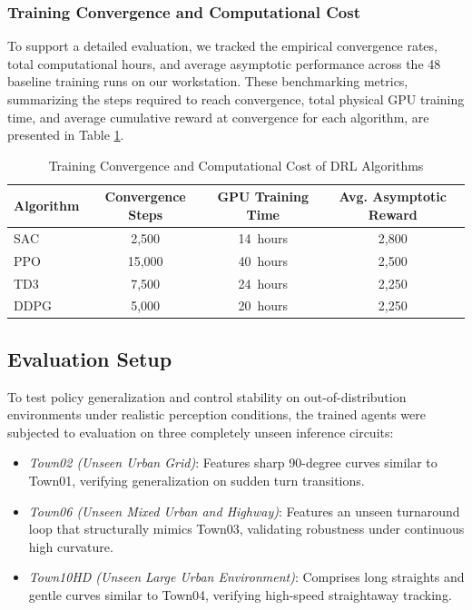 \documentclass[sn-mathphys,Numbered]{sn-jnl}
\begin{document}
\subsubsection{Training Convergence and Computational Cost}
To support a detailed evaluation, we tracked the empirical convergence rates, total computational hours, and average asymptotic performance across the 48 baseline training runs on our workstation. These benchmarking metrics, summarizing the steps required to reach convergence, total physical GPU training time, and average cumulative reward at convergence for each algorithm, are presented in Table \ref{tab:training_convergence_cost}.

\begin{table}[htbp]
\centering
\caption{Training Convergence and Computational Cost of DRL Algorithms}
\label{tab:training_convergence_cost}
\begin{tabular}{lccc}
\hline
\textbf{Algorithm} & \textbf{Convergence Steps} & \textbf{GPU Training Time} & \textbf{Avg. Asymptotic Reward} \\
\hline
SAC  & 2,500 & \SI{14}{hours} & 2,800 \\
PPO  & 15,000 & \SI{40}{hours} & 2,500 \\
TD3  & 7,500 & \SI{24}{hours} & 2,250 \\
DDPG & 5,000 & \SI{20}{hours} & 2,250 \\
\hline
\end{tabular}
\end{table}

\subsection{Evaluation Setup}
\label{sec:evaluation_setup}

To test policy generalization and control stability on out-of-distribution environments under realistic perception conditions, the trained agents were subjected to evaluation on three completely unseen inference circuits:
\begin{itemize}
    \item \textit{Town02 (Unseen Urban Grid)}: Features sharp 90-degree curves similar to Town01, verifying generalization on sudden turn transitions.
    \item \textit{Town06 (Unseen Mixed Urban and Highway)}: Features an unseen turnaround loop that structurally mimics Town03, validating robustness under continuous high curvature.
    \item \textit{Town10HD (Unseen Large Urban Environment)}: Comprises long straights and gentle curves similar to Town04, verifying high-speed straightaway tracking.
\end{itemize}
\end{document}
